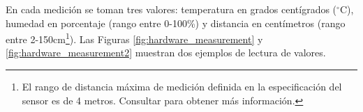 \documentclass[12pt,a4paper, twoside]{report}
\begin{document}
%	
	
	En cada medición se toman tres valores: temperatura en grados centígrados ($^{\circ}$C), humedad en porcentaje (rango entre 0-100\%) y distancia en centímetros (rango entre 2-150cm\footnote{El rango de distancia máxima de medición definida en la especificación del \gls{sensor} es de 4 metros. Consultar \cite{hcsr04:datasheet} para obtener más información.}). Las Figuras \ref{fig:hardware_measurement} y \ref{fig:hardware_measurement2} muestran dos ejemplos de lectura de valores. \\
	
\end{document}
